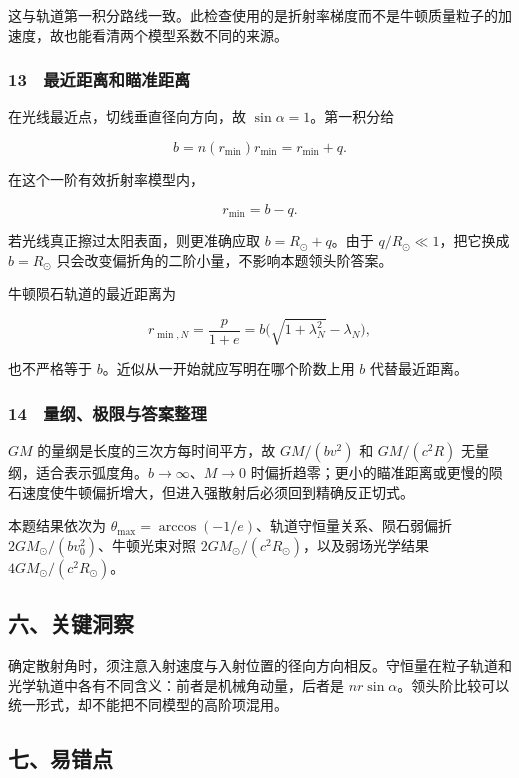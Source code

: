 \documentclass[12pt,a4paper,fontset=fandol]{ctexart}
\begin{document}
这与轨道第一积分路线一致。此检查使用的是折射率梯度而不是牛顿质量粒子的加速度，故也能看清两个模型系数不同的来源。

\subsubsection{13　最近距离和瞄准距离}\label{ux6700ux8fd1ux8dddux79bbux548cux7784ux51c6ux8dddux79bb}

在光线最近点，切线垂直径向方向，故 \(\sin\alpha=1\)。第一积分给

\[b=n(r_{\min})r_{\min}=r_{\min}+q.\]

在这个一阶有效折射率模型内，

\[r_{\min}=b-q.\]

若光线真正擦过太阳表面，则更准确应取 \(b=R_\odot+q\)。由于
\(q/R_\odot\ll1\)，把它换成 \(b=R_\odot\)
只会改变偏折角的二阶小量，不影响本题领头阶答案。

牛顿陨石轨道的最近距离为

\[r_{\min,N}=\frac{p}{1+e}
=b\big(\sqrt{1+\lambda_N^2}-\lambda_N\big),\]

也不严格等于 \(b\)。近似从一开始就应写明在哪个阶数上用 \(b\)
代替最近距离。

\subsubsection{14　量纲、极限与答案整理}\label{ux91cfux7eb2ux6781ux9650ux4e0eux7b54ux6848ux6574ux7406}

\(GM\) 的量纲是长度的三次方每时间平方，故 \(GM/(bv^2)\) 和 \(GM/(c^2R)\)
无量纲，适合表示弧度角。\(b\to\infty\)、\(M\to0\)
时偏折趋零；更小的瞄准距离或更慢的陨石速度使牛顿偏折增大，但进入强散射后必须回到精确反正切式。

本题结果依次为
\(\theta_{\max}=\arccos(-1/e)\)、轨道守恒量关系、陨石弱偏折
\(2GM_\odot/(bv_0^2)\)、牛顿光束对照
\(2GM_\odot/(c^2R_\odot)\)，以及弱场光学结果
\(4GM_\odot/(c^2R_\odot)\)。

\subsection{六、关键洞察}\label{ux516dux5173ux952eux6d1eux5bdf-5}

确定散射角时，须注意入射速度与入射位置的径向方向相反。守恒量在粒子轨道和光学轨道中各有不同含义：前者是机械角动量，后者是
\(nr\sin\alpha\)。领头阶比较可以统一形式，却不能把不同模型的高阶项混用。

\subsection{七、易错点}\label{ux4e03ux6613ux9519ux70b9-5}
\end{document}
